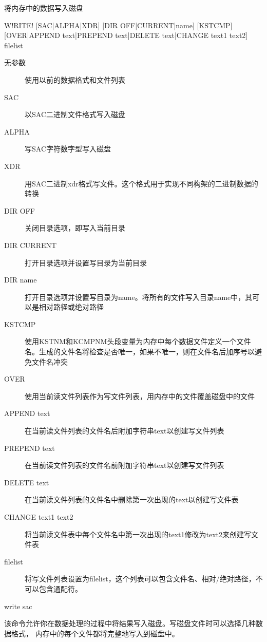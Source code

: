 \label{cmd:write}

将内存中的数据写入磁盘

\begin{SACSTX}
W!RITE! [SAC|ALPHA|XDR] [DIR OFF|CURRENT|name] [KSTCMP] 
    [OVER|APPEND text|PREPEND text|DELETE text|CHANGE text1 text2] filelist
\end{SACSTX}

\begin{description}
\item [无参数] 使用以前的数据格式和文件列表
\item [SAC] 以SAC二进制文件格式写入磁盘 
\item [ALPHA] 写SAC字符数字型写入磁盘
\item [XDR] 用SAC二进制xdr格式写文件。这个格式用于实现不同构架的二进制数据的转换
\item [DIR OFF] 关闭目录选项，即写入当前目录 
\item [DIR CURRENT] 打开目录选项并设置写目录为当前目录 
\item [DIR name] 打开目录选项并设置写目录为name。将所有的文件写入目录name中，其可以是相对路径或绝对路径
\item [KSTCMP] 使用KSTNM和KCMPNM头段变量为内存中每个数据文件定义一个文件名。生成的文件名将检查是否唯一，如果不唯一，则在文件名后加序号以避免文件名冲突
\item [OVER] 使用当前读文件列表作为写文件列表，用内存中的文件覆盖磁盘中的文件
\item [APPEND text] 在当前读文件列表的文件名后附加字符串text以创建写文件列表
\item [PREPEND text] 在当前读文件列表的文件名前附加字符串text以创建写文件列表 
\item [DELETE text] 在当前读文件列表的文件名中删除第一次出现的text以创建写文件表 
\item [CHANGE text1 text2] 将当前读文件表中每个文件名中第一次出现的text1修改为text2来创建写文件表 
\item [filelist] 将写文件列表设置为filelist，这个列表可以包含文件名、相对/绝对路径，不可以包含通配符。 
\end{description}

\begin{SACDFT}
write sac
\end{SACDFT}

该命令允许你在数据处理的过程中将结果写入磁盘。写磁盘文件时可以选择几种数据格式，
内存中的每个文件都将完整地写入到磁盘中。

